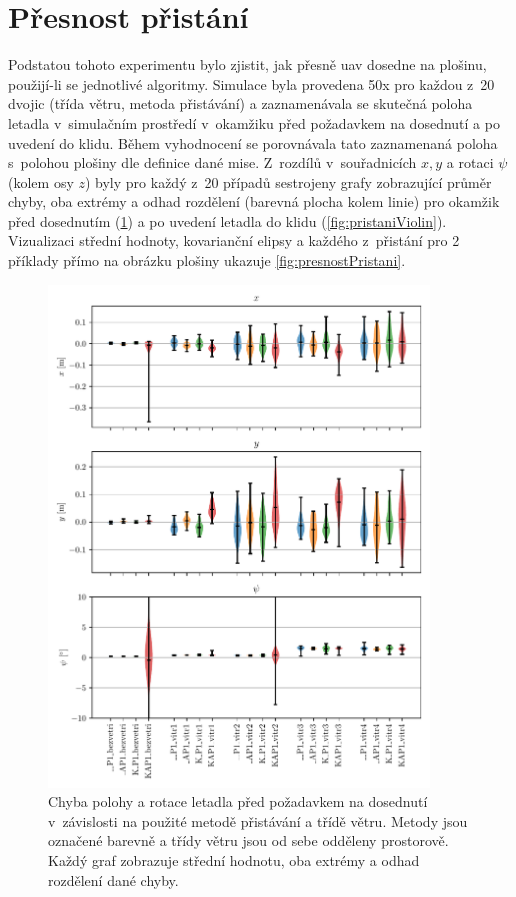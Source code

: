   \section{Přesnost přistání} \label{sec:presnostPristani}
    
    Podstatou tohoto experimentu bylo zjistit, jak přesně \acrshort{uav} dosedne na plošinu, použijí-li se jednotlivé algoritmy. Simulace byla provedena 50x pro každou z~20 dvojic (třída větru, metoda přistávání) a zaznamenávala se skutečná poloha letadla v~simulačním prostředí v~okamžiku před požadavkem na dosednutí a po uvedení do klidu. Během vyhodnocení se porovnávala tato zaznamenaná poloha s~polohou plošiny dle definice dané mise. Z~rozdílů v~souřadnicích $x, y$ a rotaci $\psi$ (kolem osy $z$) byly pro každý z~20 případů sestrojeny grafy zobrazující průměr chyby, oba extrémy a odhad rozdělení (barevná plocha kolem linie) pro okamžik před dosednutím (\cref{fig:dosednutiViolin}) a po uvedení letadla do klidu (\cref{fig:pristaniViolin}). Vizualizaci střední hodnoty, kovarianční elipsy a každého z~přistání pro 2 příklady přímo na obrázku plošiny ukazuje \cref{fig:presnostPristani}.

    \begin{figure}[H]
      \centering
      \includegraphics[width=0.9\textwidth]{img/results/presnostDotyku.pdf}
      \caption[Chyba před dosednutím]{Chyba polohy a rotace letadla před požadavkem na dosednutí v~závislosti na použité metodě přistávání a třídě větru. Metody jsou označené barevně a třídy větru jsou od sebe odděleny prostorově. Každý graf zobrazuje střední hodnotu, oba extrémy a odhad rozdělení dané chyby.}
      \label{fig:dosednutiViolin}
    \end{figure}

